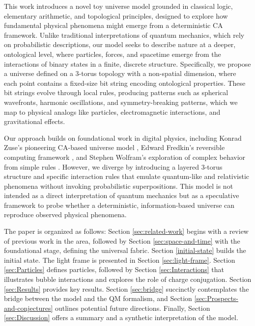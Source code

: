 \documentclass[12pt]{article}
\begin{document}
This work introduces a novel toy universe model grounded in classical logic, elementary arithmetic, and topological principles, designed to explore how fundamental physical phenomena might emerge from a deterministic CA framework. Unlike traditional interpretations of quantum mechanics, which rely on probabilistic descriptions, our model seeks to describe nature at a deeper, ontological level, where particles, forces, and spacetime emerge from the interactions of binary states in a finite, discrete structure. Specifically, we propose a universe defined on a 3-torus topology with a non-spatial dimension, where each point contains a fixed-size bit string encoding ontological properties. These bit strings evolve through local rules, producing patterns such as spherical wavefronts, harmonic oscillations, and symmetry-breaking patterns, which we map to physical analogs like particles, electromagnetic interactions, and gravitational effects.

Our approach builds on foundational work in digital physics, including Konrad Zuse’s pioneering CA-based universe model \cite{zuse}, Edward Fredkin’s reversible computing framework \cite{fredkin}, and Stephen Wolfram’s exploration of complex behavior from simple rules \cite{wolfram}. However, we diverge by introducing a layered 3-torus structure and specific interaction rules that emulate quantum-like and relativistic phenomena without invoking probabilistic superpositions. This model is not intended as a direct interpretation of quantum mechanics but as a speculative framework to probe whether a deterministic, information-based universe can reproduce observed physical phenomena.

The paper is organized as follows: Section \ref{sec:related-work} begins with a review of previous work in the area, followed by Section \ref{sec:space-and-time} with the foundational stage, defining the universal fabric. Section \ref{initial-state} builds the initial state. The light frame is presented in Section \ref{sec:light-frame}. Section \ref{sec:Particles} defines particles, followed by Section \ref{sec:Interactions} that illustrates bubble interactions and explores the role of charge conjugation. Section \ref{sec:Results} provides key results. Section \ref{sec:bridge} succinctly contemplates the bridge between the model and the QM formalism, and Section \ref{sec:Prospects-and-conjectures} outlines potential future directions. Finally, Section \ref{sec:Discussion} offers a summary and a synthetic interpretation of the model.
\end{document}
